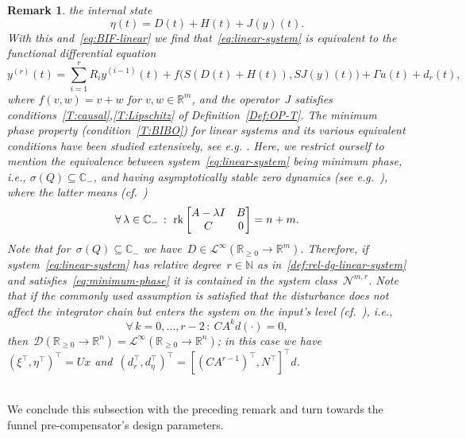 \documentclass[ envcountsect, envcountsame]{svjour3}
\newtheorem{Remark}[Theorem]{Remark}
\newcommand{\R}{\mathbb{R}}
\newcommand{\C}{\mathbb{C}}
\newcommand{\N}{\mathbb{N}}
\newcommand{\cD}{\mathcal{D}}
\newcommand{\cL}{\mathcal{L}}
\newcommand{\cN}{\mathcal{N}}
\newcommand{\rp}{\mathbb{R}_{\geq 0}}
\DeclareMathOperator{\rk}{\rm rk}
\begin{document}
\begin{Remark}
the internal state
\begin{equation*}
\eta(t) =  D(t) + H(t) + J(y)(t). 
\end{equation*}
With this and~\eqref{eq:BIF-linear} we find that~\eqref{eq:linear-system} is equivalent to the functional differential equation
\begin{equation*}
y^{(r)}(t) = \sum_{i=1}^{r} R_i y^{(i-1)}(t) + f\big(S(D(t)+H(t)),SJ(y)(t) \big)+ \Gamma u(t) + d_r(t),
\end{equation*} 
where $f(v,w) = v + w$ for $v,w \in \R^m$, and the operator~$J$ satisfies conditions~\ref{T:causal},\ref{T:Lipschitz} of Definition~\ref{Def:OP-T}.
The minimum phase property (condition~\ref{T:BIBO}) for linear systems and its various equivalent conditions have been studied extensively, see e.g. 
\cite{ByrnWill84,Berg14a,TrenStoo01}.
Here, we restrict ourself to mention the equivalence between system~\eqref{eq:linear-system} being minimum phase, i.e., $\sigma(Q) \subseteq \C_-$, and having asymptotically stable zero dynamics (see e.g.~\cite{IlchWirt13}), where the latter means (cf.~\cite{IlchRyan07,Isid95})
\begin{equation} \label{eq:minimum-phase}
 \forall\,  \lambda \in \C_- \, : \  \rk \begin{bmatrix}  A - \lambda I  &  B \\   C & 0  \end{bmatrix} = n + m.
 \end{equation} 
%
Note that for~$\sigma(Q) \subseteq \C_-$ we have~$D \in \cL^\infty(\rp \to \R^m)$.
Therefore, if system~\eqref{eq:linear-system} 
has relative degree~$r \in \N$ as in~\eqref{def:rel-dg-linear-system} and satisfies~\eqref{eq:minimum-phase} it is contained in the system class~$\cN^{m,r}$.
%
Note that if the commonly used assumption is satisfied that the disturbance does not affect the integrator chain but enters the system on the input's level (cf.~\cite{Berg20,Berg21}), i.e.,
\begin{equation*}
\forall\, k=0,\ldots,r-2 \, : \ CA^kd(\cdot) = 0,
\end{equation*}
then~$\cD(\rp \to \R^n) = \cL^\infty(\rp \to \R^n)$; 
in this case we have~$(\xi^\top , \eta^\top)^\top = Ux$ and~$(d_r^\top, d_\eta^\top)^\top = [(CA^{r-1})^\top, N^\top]^\top d$.
\end{Remark}
%

\ \\
We conclude this subsection with the preceding remark and turn towards the funnel pre-compensator's design parameters.
%
%
\end{document}
